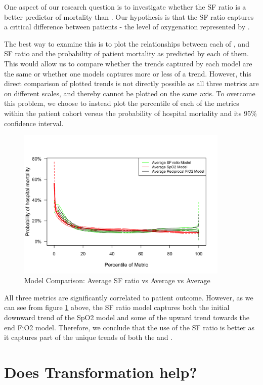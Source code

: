 One aspect of our research question is to investigate whether the SF ratio is a better predictor of mortality than \Sp. Our hypothesis is that the SF ratio captures a critical difference between patients - the level of oxygenation represented by \Fi. 

The best way to examine this is to plot the relationships between each of \Sp, \Fi and SF ratio and the probability of patient mortality as predicted by each of them. This would allow us to compare whether the trends captured by each model are the same or whether one models captures more or less of a trend. However, this direct comparison of plotted trends is not directly possible as all three metrics are on different scales, and thereby cannot be plotted on the same axis. To overcome this problem, we choose to instead plot the percentile of each of the metrics within the patient cohort versus the probability of hospital mortality and its 95\% confidence interval.  

\begin{figure}[H]
	\centering
	\includegraphics[width=0.9\textwidth]{figures/toratioornottoratio-4.png}
	\caption{Model Comparison: Average SF ratio vs Average \Sp vs Average \Fi}
	\label{fig:toratioornot}
\end{figure}

All three metrics are significantly correlated to patient outcome. However, as we can see from  figure \ref{fig:toratioornot} above, the SF ratio model captures both the initial downward trend of the SpO2 model and some of the upward trend towards the end  FiO2 model. Therefore, we conclude that the use of the SF ratio is better as it captures part of the unique trends of both the \Sp and \Fi. 


\section{Does Transformation help?}


